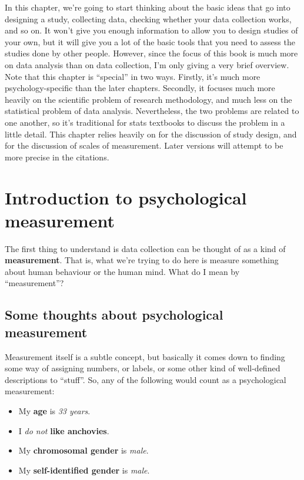 \documentclass[
]{book}
\begin{document}
In this chapter, we're going to start thinking about the basic ideas that go into designing a study, collecting data, checking whether your data collection works, and so on. It won't give you enough information to allow you to design studies of your own, but it will give you a lot of the basic tools that you need to assess the studies done by other people. However, since the focus of this book is much more on data analysis than on data collection, I'm only giving a very brief overview. Note that this chapter is ``special'' in two ways. Firstly, it's much more psychology-specific than the later chapters. Secondly, it focuses much more heavily on the scientific problem of research methodology, and much less on the statistical problem of data analysis. Nevertheless, the two problems are related to one another, so it's traditional for stats textbooks to discuss the problem in a little detail. This chapter relies heavily on \citet{Campbell1963} for the discussion of study design, and \citet{Stevens1946} for the discussion of scales of measurement. Later versions will attempt to be more precise in the citations.

\hypertarget{introduction-to-psychological-measurement}{%
\section{Introduction to psychological measurement}\label{introduction-to-psychological-measurement}}

The first thing to understand is data collection can be thought of as a kind of \textbf{measurement}. That is, what we're trying to do here is measure something about human behaviour or the human mind. What do I mean by ``measurement''?

\hypertarget{some-thoughts-about-psychological-measurement}{%
\subsection{Some thoughts about psychological measurement}\label{some-thoughts-about-psychological-measurement}}

Measurement itself is a subtle concept, but basically it comes down to finding some way of assigning numbers, or labels, or some other kind of well-defined descriptions to ``stuff''. So, any of the following would count as a psychological measurement:

\begin{itemize}
\item
  My {\textbf{age}} is {\emph{33 years}}.
\item
  I {\emph{do not}} {\textbf{like anchovies}}.
\item
  My {\textbf{chromosomal gender}} is {\emph{male}}.
\item
  My {\textbf{self-identified gender}} is {\emph{male}}.
\end{itemize}
\end{document}
